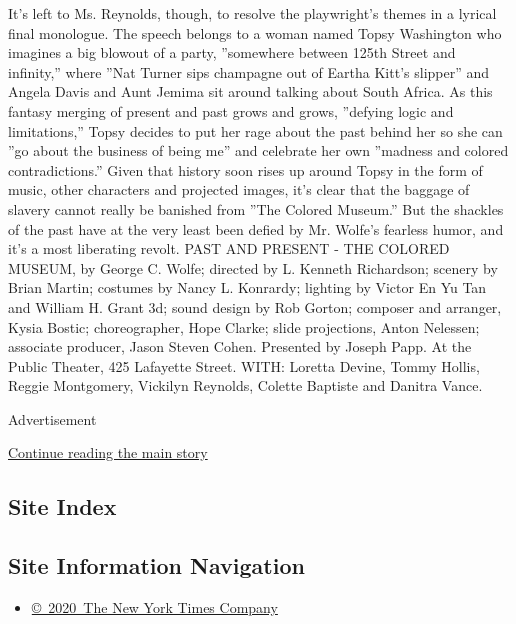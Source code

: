 It's left to Ms. Reynolds, though, to resolve the playwright's themes in
a lyrical final monologue. The speech belongs to a woman named Topsy
Washington who imagines a big blowout of a party, ''somewhere between
125th Street and infinity,'' where ''Nat Turner sips champagne out of
Eartha Kitt's slipper'' and Angela Davis and Aunt Jemima sit around
talking about South Africa. As this fantasy merging of present and past
grows and grows, ''defying logic and limitations,'' Topsy decides to put
her rage about the past behind her so she can ''go about the business of
being me'' and celebrate her own ''madness and colored contradictions.''
Given that history soon rises up around Topsy in the form of music,
other characters and projected images, it's clear that the baggage of
slavery cannot really be banished from ''The Colored Museum.'' But the
shackles of the past have at the very least been defied by Mr. Wolfe's
fearless humor, and it's a most liberating revolt. PAST AND PRESENT -
THE COLORED MUSEUM, by George C. Wolfe; directed by L. Kenneth
Richardson; scenery by Brian Martin; costumes by Nancy L. Konrardy;
lighting by Victor En Yu Tan and William H. Grant 3d; sound design by
Rob Gorton; composer and arranger, Kysia Bostic; choreographer, Hope
Clarke; slide projections, Anton Nelessen; associate producer, Jason
Steven Cohen. Presented by Joseph Papp. At the Public Theater, 425
Lafayette Street. WITH: Loretta Devine, Tommy Hollis, Reggie Montgomery,
Vickilyn Reynolds, Colette Baptiste and Danitra Vance.

Advertisement

\protect\hyperlink{after-bottom}{Continue reading the main story}

\hypertarget{site-index}{%
\subsection{Site Index}\label{site-index}}

\hypertarget{site-information-navigation}{%
\subsection{Site Information
Navigation}\label{site-information-navigation}}

\begin{itemize}
\tightlist
\item
  \href{https://help.nytimes3xbfgragh.onion/hc/en-us/articles/115014792127-Copyright-notice}{©~2020~The
  New York Times Company}
\end{itemize}

